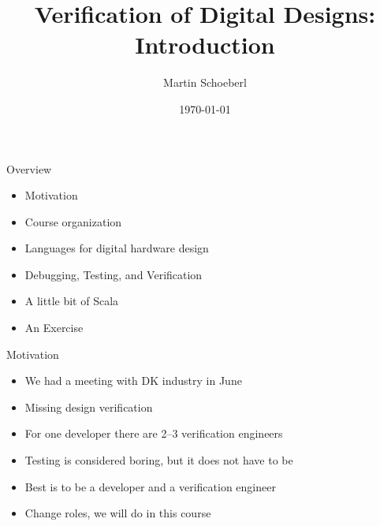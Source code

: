 

\newif\ifbook


\title{Verification of Digital Designs: Introduction}
\author{Martin Schoeberl}
\date{\today}



\begin{frame}
\titlepage
\end{frame}


\begin{frame}[fragile]{Overview}
\begin{itemize}
\item Motivation
\item Course organization
\item Languages for digital hardware design
\item Debugging, Testing, and Verification
\item A little bit of Scala
\item An Exercise
\end{itemize}
\end{frame}


\begin{frame}[fragile]{Motivation}
\begin{itemize}
\item We had a meeting with DK industry in June
\item Missing design verification
\item For one developer there are 2--3 verification engineers
\item Testing is considered boring, but it does not have to be
\item Best is to be a developer and a verification engineer
\item Change roles, we will do in this course
\end{itemize}
\end{frame}


